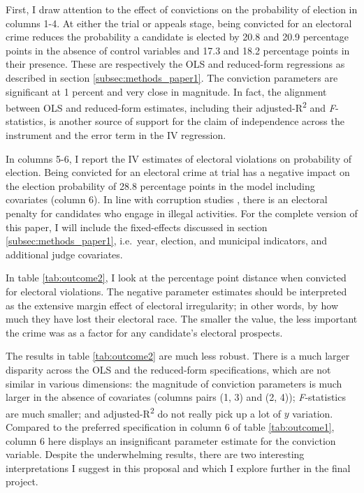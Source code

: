 \documentclass[11pt]{article}
\begin{document}
\clearpage



First, I draw attention to the effect of convictions on the probability of election in columns 1-4. At either the trial or appeals stage, being convicted for an electoral crime reduces the probability a candidate is elected by 20.8 and 20.9 percentage points in the absence of control variables and 17.3 and 18.2 percentage points in their presence. These are respectively the OLS and reduced-form regressions as described in section \ref{subsec:methods_paper1}. The conviction parameters are significant at 1 percent and very close in magnitude. In fact, the alignment between OLS and reduced-form estimates, including their adjusted-R\textsuperscript{2} and \emph{F}-statistics, is another source of support for the claim of independence across the instrument and the error term in the IV regression.

In columns 5-6, I report the IV estimates of electoral violations on probability of election. Being convicted for an electoral crime at trial has a negative impact on the election probability of 28.8 percentage points in the model including covariates (column 6). In line with corruption studies \citep{FerrazElectoralAccountabilityCorruption2011a,ChongLookingIncumbentExposing2013}, there is an electoral penalty for candidates who engage in illegal activities. For the complete version of this paper, I will include the fixed-effects discussed in section \ref{subsec:methods_paper1}, i.e.~year, election, and municipal indicators, and additional judge covariates.

In table \ref{tab:outcome2}, I look at the percentage point distance when convicted for electoral violations. The negative parameter estimates should be interpreted as the extensive margin effect of electoral irregularity; in other words, by how much they have lost their electoral race. The smaller the value, the less important the crime was as a factor for any candidate's electoral prospects.
\clearpage


The results in table \ref{tab:outcome2} are much less robust. There is a much larger disparity across the OLS and the reduced-form specifications, which are not similar in various dimensions: the magnitude of conviction parameters is much larger in the absence of covariates (columns pairs (1, 3) and (2, 4)); \emph{F}-statistics are much smaller; and adjusted-R\textsuperscript{2} do not really pick up a lot of $y$ variation. Compared to the preferred specification in column 6 of table \ref{tab:outcome1}, column 6 here displays an insignificant parameter estimate for the conviction variable. Despite the underwhelming results, there are two interesting interpretations I suggest in this proposal and which I explore further in the final project.
\end{document}

